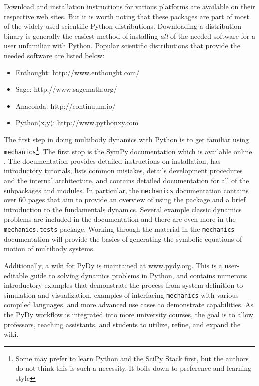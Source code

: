 \documentclass[twocolumn,10pt, final]{asme2e}
\begin{document}
Download and installation instructions for various platforms are available on
their respective web sites. But it is worth noting that these packages are part
of most of the widely used scientific Python distributions. Downloading a
distribution binary is generally the easiest method of installing \emph{all} of
the needed software for a user unfamiliar with Python. Popular scientific
distributions that provide the needed software are listed below:
%
\begin{itemize}
  \item Enthought: http://www.enthought.com/
  \item Sage: http://www.sagemath.org/
  \item Anaconda: http://continuum.io/
  \item Python(x,y): http://www.pythonxy.com
\end{itemize}

The first step in doing multibody dynamics with Python is to get familiar using
\verb|mechanics|\footnote{Some may prefer to learn Python and the SciPy Stack
first, but the authors do not think this is such a necessity. It boils down to
preference and learning style}. The first stop is the SymPy documentation which
is available online \cite{SymPyDocs}. The documentation provides detailed
instructions on installation, has introductory tutorials, lists common
mistakes, details development procedures and the internal architecture, and
contains detailed documentation for all of the subpackages and modules. In
particular, the \verb|mechanics| documentation contains over 60 pages that aim
to provide an overview of using the package and a brief introduction to the
fundamentals dynamics. Several example classic dynamics problems are included
in the documentation and there are even more in the \verb|mechanics.tests|
package. Working through the material in the \verb|mechanics| documentation
will provide the basics of generating the symbolic equations of motion of
multibody systems.

Additionally, a wiki for PyDy is maintained at www.pydy.org. This is a
user-editable guide to solving dynamics problems in Python, and contains
numerous introductory examples that demonstrate the process from system
definition to simulation and visualization, examples of interfacing
\verb|mechanics| with various compiled languages, and more advanced use cases
to demonstrate capabilities. As the PyDy workflow is integrated into more
university courses, the goal is to allow professors, teaching assistants, and
students to utilize, refine, and expand the wiki.
\end{document}
